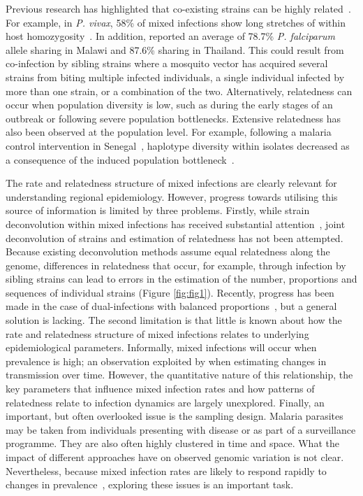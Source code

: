 \documentclass[9pt,lineno]{elife}
\begin{document}
Previous research has highlighted that co-existing strains can be highly related~\citep{Nair2014, Trevino2017}.  For example, in {\it P. vivax}, 58\% of mixed infections show long stretches of within host homozygosity~\citep{Pearson2016}. In addition, \citet{Nkhoma2012} reported an average of 78.7\% {\it P. falciparum} allele sharing in Malawi and 87.6\% sharing in Thailand. This could result from co-infection by sibling strains where a mosquito vector has acquired several strains from biting multiple infected individuals, a single individual infected by more than one strain, or a combination of the two.  Alternatively, relatedness can occur when population diversity is low, such as during the early stages of an outbreak or following severe population bottlenecks. Extensive relatedness has also been observed at the population level.  For example, following a malaria control intervention in Senegal~\citep{Mouzin2010}, haplotype diversity within isolates decreased as a consequence of the induced population bottleneck~\citep{Wong2017}.

The rate and relatedness structure of mixed infections are clearly relevant for understanding regional epidemiology.  However, progress towards utilising this source of information is limited by three problems.  Firstly, while strain deconvolution within mixed infections has received substantial attention~\citep{Galinsky2015, Jack2016, Chang2017, Zhu2017}, joint deconvolution of strains and estimation of relatedness has not been attempted.  Because existing deconvolution methods assume equal relatedness along the genome, differences in relatedness that occur, for example, through infection by sibling strains can lead to errors in the estimation of the number, proportions and sequences of individual strains (Figure \ref{fig:fig1}).  Recently, progress has been made in the case of dual-infections with balanced proportions~\citep{Henden2016}, but a general solution is lacking.  The second limitation is that little is known about how the rate and relatedness structure of mixed infections relates to underlying epidemiological parameters.  Informally, mixed infections will occur when prevalence is high; an observation exploited by \citet{Cerqueira2017} when estimating changes in transmission over time.  However, the quantitative nature of this relationship, the key parameters that influence mixed infection rates and how patterns of relatedness relate to infection dynamics are largely unexplored.  Finally, an important, but often overlooked issue is the sampling design.  Malaria parasites may be taken from individuals presenting with disease or as part of a surveillance programme.  They are also often highly clustered in time and space.  What the impact of different approaches have on observed genomic variation is not clear.  Nevertheless, because mixed infection rates are likely to respond rapidly to changes in prevalence~\citep{volkman2012}, exploring these issues is an important task.
\end{document}
